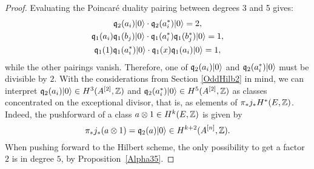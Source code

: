 \begin{proposition}
\begin{proof}
Evaluating the Poincar\'e duality pairing between degrees 3 and 5 gives:
\begin{gather*}
 \mathfrak{q}_2(a_i)|0\rangle \cdot \mathfrak{q}_2(a^*_i)|0\rangle = 2, \\
 \mathfrak{q}_1(a_i)\mathfrak{q}_1(b_j)|0\rangle \cdot  \mathfrak{q}_1(a^*_i)\mathfrak{q}_1(b^*_j)|0\rangle = 1, \\
 \mathfrak{q}_1(1)\mathfrak{q}_1(a^*_i)|0\rangle \cdot \mathfrak{q}_1(x)\mathfrak{q}_1(a_i)|0\rangle = 1,
\end{gather*}
while the other pairings vanish. Therefore, one of $\mathfrak{q}_2(a_i)|0\rangle$ and $\mathfrak{q}_2(a^*_i)|0\rangle$ must be divisible by $2$. 
With the considerations from Section \ref{OddHilb2} in mind, we can interpret $\mathfrak{q}_2(a_i)|0\rangle\in H^3(A^{[2]},\mathbb{Z})$ and $\mathfrak{q}_2(a^*_i)|0\rangle\in H^5(A^{[2]},\mathbb{Z})$ as classes concentrated on the exceptional divisor, that is, as elements of $\pi_* j_*H^*(E,\mathbb{Z})$. Indeed,
the pushforward of a class $a\otimes 1 \in H^{k}(E,\mathbb{Z})$ is given by 
$$
\pi_* j_*(a\otimes 1) = \mathfrak{q}_2(a)|0\rangle \in H^{k+2}(A^{[n]},\mathbb{Z}).
$$
When pushing forward to the Hilbert scheme, the only possibility to get a factor $2$ is in degree $5$, by Proposition~\ref{Alpha35}. 
\end{proof}

\end{proposition}
